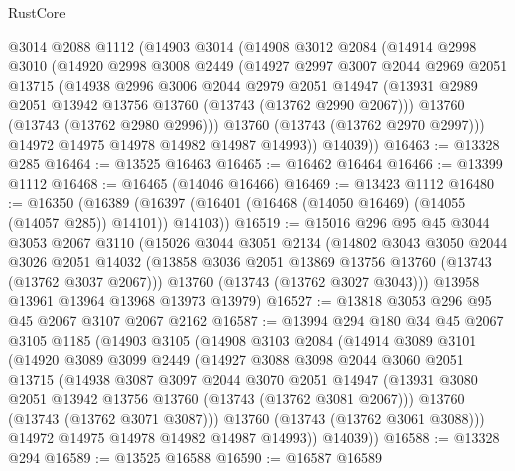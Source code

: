 \begin{lexlean}{RustCore}
\begin{coremodule}
    @3014
    @2088
    @1112
    (@14903
      @3014
      (@14908
        @3012
        @2084
        (@14914
          @2998
          @3010
          (@14920
            @2998
            @3008
            @2449
            (@14927
              @2997
              @3007
              @2044
              @2969
              @2051
              @13715
              (@14938
                @2996
                @3006
                @2044
                @2979
                @2051
                @14947
                (@13931 @2989 @2051 @13942 @13756 @13760 (@13743 (@13762 @2990 @2067)))
                @13760
                (@13743 (@13762 @2980 @2996)))
              @13760
              (@13743 (@13762 @2970 @2997)))
            @14972
            @14975
            @14978
            @14982
            @14987
            @14993))
        @14039))
@16463 := @13328 @285
@16464 := @13525 @16463
@16465 := @16462 @16464
@16466 := @13399 @1112
@16468 := @16465 (@14046 @16466)
@16469 := @13423 @1112
@16480 := @16350
    (@16389 (@16397 (@16401 (@16468 (@14050 @16469) (@14055 (@14057 @285)) @14101)) @14103))
@16519 := @15016
    @296
    @95
    @45
    @3044
    @3053
    @2067
    @3110
    (@15026
      @3044
      @3051
      @2134
      (@14802
        @3043
        @3050
        @2044
        @3026
        @2051
        @14032
        (@13858 @3036 @2051 @13869 @13756 @13760 (@13743 (@13762 @3037 @2067)))
        @13760
        (@13743 (@13762 @3027 @3043)))
      @13958
      @13961
      @13964
      @13968
      @13973
      @13979)
@16527 := @13818 @3053 @296 @95 @45 @2067 @3107 @2067 @2162
@16587 := @13994
    @294
    @180
    @34
    @45
    @2067
    @3105
    @1185
    (@14903
      @3105
      (@14908
        @3103
        @2084
        (@14914
          @3089
          @3101
          (@14920
            @3089
            @3099
            @2449
            (@14927
              @3088
              @3098
              @2044
              @3060
              @2051
              @13715
              (@14938
                @3087
                @3097
                @2044
                @3070
                @2051
                @14947
                (@13931 @3080 @2051 @13942 @13756 @13760 (@13743 (@13762 @3081 @2067)))
                @13760
                (@13743 (@13762 @3071 @3087)))
              @13760
              (@13743 (@13762 @3061 @3088)))
            @14972
            @14975
            @14978
            @14982
            @14987
            @14993))
        @14039))
@16588 := @13328 @294
@16589 := @13525 @16588
@16590 := @16587 @16589

\end{coremodule}
\end{lexlean}
